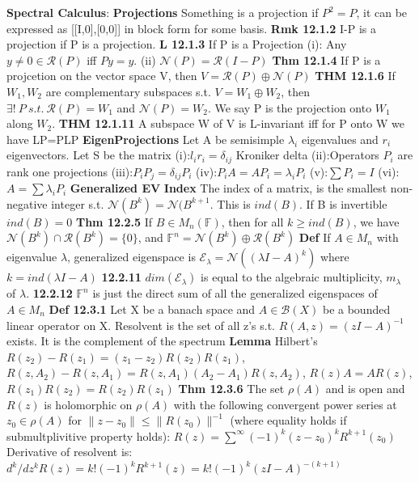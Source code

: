\documentclass[8pt]{extarticle}
\theoremstyle{definition}
\begin{document}
\textbf{Spectral Calculus}: 
\textbf{Projections} Something is a projection if $P^2 = P$, it can be expressed as [[I,0],[0,0]] in block form for some basis.
\textbf{Rmk 12.1.2} I-P is a projection if P is a projection.
\textbf{L 12.1.3} If P is a Projection (i): Any $y \neq 0 \in \mathscr{R}(P)$ iff $Py = y$. (ii) $\mathscr{N}(P) = \mathscr{R}(I-P)$
\textbf{Thm 12.1.4} If P is a projcetion on the vector space V, then $V = \mathscr{R}(P) \oplus \mathscr{N}(P)$
\textbf{THM 12.1.6} If $W_1, W_2$ are complementary subspaces s.t. $V = W_1 \oplus W_2$, then $\exists !~P~s.t.~\mathscr{R}(P) = W_1$ and $\mathscr{N}(P) = W_2$. We say P is the projection onto $W_1$ along $W_2$.
\textbf{THM 12.1.11} A subspace W of V is L-invariant iff for P onto W we have LP=PLP
\textbf{EigenProjections} Let A be semisimple $\lambda_i$ eigenvalues and $r_i$ eigenvectors. Let S be the matrix 
(i):$l_ir_i = \delta_{ij}$ Kroniker delta
(ii):Operators $P_i$ are rank one projections
(iii):$P_iP_j = \delta_{ij}P_i$
(iv):$P_iA = AP_i = \lambda_iP_i$
(v):$\sum P_i = I$
(vi): $A = \sum \lambda_i P_i$
\textbf{Generalized EV} \textbf{Index} The index of a matrix, is the smallest non-negative integer s.t. $\mathscr{N}(B^k) = \mathscr{N}(B^{k+1}$. This is $ind(B)$.
If B is invertible $ind(B) = 0$
\textbf{Thm 12.2.5} If $B \in M_n(\mathbb{F})$, then for all $k \geq ind(B)$, we have $\mathscr{N}(B^k) \cap \mathscr{R}(B^k) = \{0\}$, and $\mathbb{F}^n = \mathscr{N}(B^k) \oplus \mathscr{R}(B^k)$
\textbf{Def} If $A \in M_n$ with eigenvalue $\lambda$, generalized eigenspace is $\mathscr{E}_\lambda = \mathscr{N}( (\lambda I -A)^k)$ where $k = ind(\lambda I-A)$
\textbf{12.2.11} $dim(\mathscr{E}_\lambda)$ is equal to the algebraic multiplicity, $m_\lambda$ of $\lambda$.
\textbf{12.2.12} $\mathbb{F}^n$ is just the direct sum of all the generalized eigenspaces of $A \in M_n$
\textbf{Def 12.3.1} Let X be a banach space and $A \in \mathscr{B}(X)$ be a bounded linear operator on X. Resolvent is the set of all z's s.t. $R(A,z) = (zI-A)^{-1}$ exists. It is the complement of the spectrum
\textbf{Lemma} Hilbert's $R(z_2) -R(z_1) = (z_1-z_2)R(z_2)R(z_1)$, $R(z,A_2) - R(z,A_1) = R(z,A_1)(A_2-A_1)R(z,A_2)$, $R(z)A = AR(z)$, $R(z_1)R(z_2) = R(z_2)R(z_1)$
\textbf{Thm 12.3.6} The set $\rho(A)$ and is open and $R(z)$ is holomorphic on $\rho(A)$ with the following convergent power series at $z_0 \in \rho(A)$ for $\|z - z_0\| \leq \|R(z_0)\|^{-1}$ (where equality holds if submultplivitive property holds):
$R(z) = \sum^\infty (-1)^k(z-z_0)^kR^{k+1}(z_0)$
Derivative of resolvent is:
$d^k/dz^k R(z) = k! (-1)^kR^{k+1}(z) = k!(-1)^k(zI-A)^{-(k+1)}$
\end{document}
